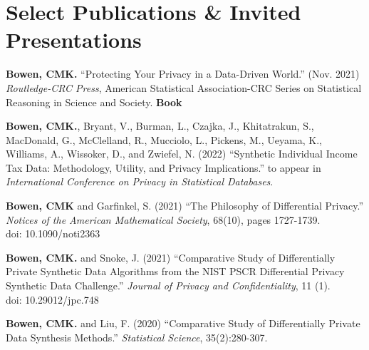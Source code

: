 \documentclass[12, letterpaper, roman]{moderncv} %
\begin{document}

\newpage
\section{Select Publications \& Invited Presentations}
\begin{etaremune}[topsep=0pt, itemsep=4pt, partopsep=0pt, parsep=0pt]

    \item \textbf{Bowen, CMK.} ``Protecting Your Privacy in a Data-Driven World.'' (Nov. 2021) \textit{Routledge-CRC Press}, American Statistical Association-CRC Series on Statistical Reasoning in Science and Society. \textbf{Book}
    
    \item \textbf{Bowen, CMK.}, Bryant, V., Burman, L., Czajka, J., Khitatrakun, S., MacDonald, G., McClelland, R., Mucciolo, L., Pickens, M., Ueyama, K., Williams, A., Wissoker, D., and Zwiefel, N. (2022) ``Synthetic Individual Income Tax Data: Methodology, Utility, and Privacy Implications.'' to appear in  \textit{International Conference on Privacy in Statistical Databases}.
    
    \item \textbf{Bowen, CMK} and Garfinkel, S. (2021) ``The Philosophy of Differential Privacy.'' \textit{Notices of the American Mathematical Society}, 68(10), pages 1727-1739.\\
    doi: 10.1090/noti2363

    \item \textbf{Bowen, CMK.} and Snoke, J. (2021) ``Comparative Study of Differentially Private Synthetic Data Algorithms from the NIST PSCR Differential Privacy Synthetic Data Challenge.'' \textit{Journal of Privacy and Confidentiality}, 11 (1).\\
    doi: 10.29012/jpc.748

    \item \textbf{Bowen, CMK.} and Liu, F. (2020) ``Comparative Study of Differentially Private Data Synthesis Methods.'' \textit{Statistical Science}, 35(2):280-307.

\end{etaremune}
\end{document}
